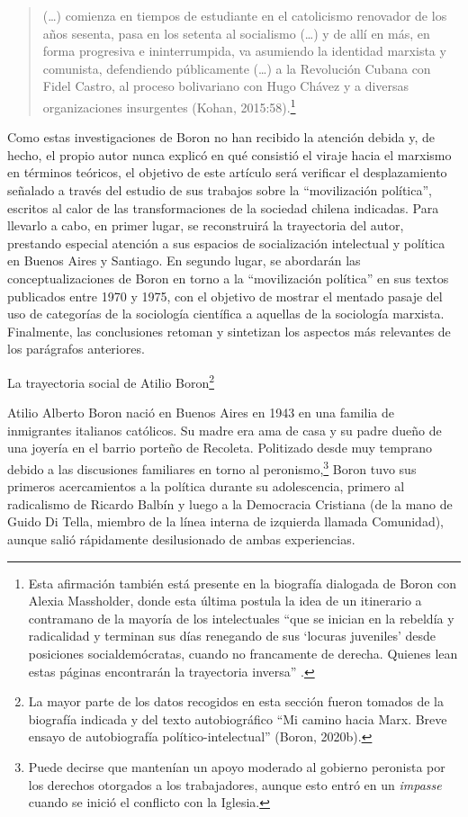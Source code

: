 \begin{quote}
(\dots) comienza en tiempos de estudiante en el catolicismo renovador de los años sesenta, pasa en los setenta al socialismo (\dots) y de allí en más, en forma progresiva e ininterrumpida, va asumiendo la identidad marxista y comunista, defendiendo públicamente (\dots) a la Revolución Cubana con Fidel Castro, al proceso bolivariano con Hugo Chávez y a diversas organizaciones insurgentes (Kohan, 2015:58).\footnote{Esta afirmación también está presente en la biografía dialogada de Boron con Alexia Massholder, donde esta última postula la idea de un itinerario a contramano de la mayoría de los intelectuales \enquote{que se inician en la rebeldía y radicalidad y terminan sus días renegando de sus \enquote{locuras juveniles} desde posiciones socialdemócratas, cuando no francamente de derecha. Quienes lean estas páginas encontrarán la trayectoria inversa} \parencite[8]{1444-BORON2023}.}
\end{quote}

Como estas investigaciones de Boron no han recibido la atención debida y, de hecho, el propio autor nunca explicó en qué consistió el viraje hacia el marxismo en términos teóricos, el objetivo de este artículo será verificar el desplazamiento señalado a través del estudio de sus trabajos sobre la \enquote{movilización política}, escritos al calor de las transformaciones de la sociedad chilena indicadas. Para llevarlo a cabo, en primer lugar, se reconstruirá la trayectoria del autor, prestando especial atención a sus espacios de socialización intelectual y política en Buenos Aires y Santiago. En segundo lugar, se abordarán las conceptualizaciones de Boron en torno a la \enquote{movilización política} en sus textos publicados entre 1970 y 1975, con el objetivo de mostrar el mentado pasaje del uso de categorías de la sociología científica a aquellas de la sociología marxista. Finalmente, las conclusiones retoman y sintetizan los aspectos más relevantes de los parágrafos anteriores.

La trayectoria social de Atilio Boron\footnote{La mayor parte de los datos recogidos en esta sección fueron tomados de la biografía indicada \parencite{1444-BORON2023} y del texto autobiográfico \enquote{Mi camino hacia Marx. Breve ensayo de autobiografía político-intelectual} (Boron, 2020b).}

Atilio Alberto Boron nació en Buenos Aires en 1943 en una familia de inmigrantes italianos católicos. Su madre era ama de casa y su padre dueño de una joyería en el barrio porteño de Recoleta. Politizado desde muy temprano debido a las discusiones familiares en torno al peronismo,\footnote{Puede decirse que mantenían un apoyo moderado al gobierno peronista por los derechos otorgados a los trabajadores, aunque esto entró en un \emph{impasse} cuando se inició el conflicto con la Iglesia.} Boron tuvo sus primeros acercamientos a la política durante su adolescencia, primero al radicalismo de Ricardo Balbín y luego a la Democracia Cristiana (de la mano de Guido Di Tella, miembro de la línea interna de izquierda llamada Comunidad), aunque salió rápidamente desilusionado de ambas experiencias.

